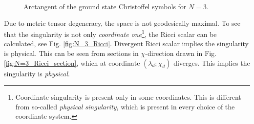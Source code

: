 \vspace{-30pt}
\begin{figure}[H]
    \centering
    \caption{Arctangent of the ground state Christoffel symbols for $N=3$.}
    \label{fig:N=3_G}
\end{figure}


Due to metric tensor degeneracy, the space is not geodesically maximal. To see that the singularity is not only \emph{coordinate one}\footnote{Coordinate singularity is present only in some coordinates. This is different from so-called \emph{physical singularity}, which is present in every choice of the coordinate system.}, the Ricci scalar can be calculated, see Fig. \ref{fig:N=3_Ricci}. Divergent Ricci scalar implies the singularity is physical. This can be seen from sections in $\chi$-direction drawn in Fig. \ref{fig:N=3_Ricci_section}, which at coordinate $(\lambda_d;\chi_d)$ diverges. This implies the singularity is \emph{physical}. 


